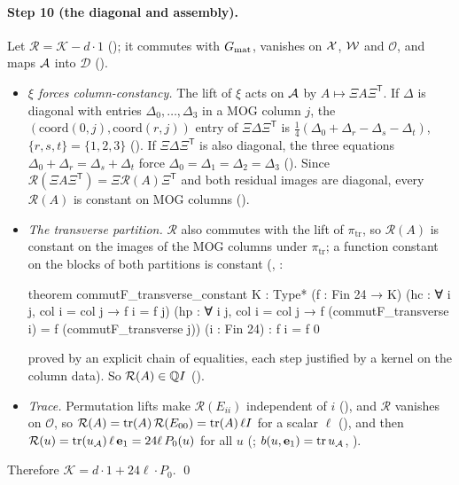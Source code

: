 \paragraph{Step 10 (the diagonal and assembly).}  Let $\mathcal R=\mathcal K-d\cdot1$ (); it commutes with
$G_{\mathrm{mat}}$, vanishes on $\mathcal{X}$, $\mathcal{W}$ and $\mathcal O$, and maps $\mathcal{A}$ into $\mathcal D$
().
\begin{itemize}
\item \emph{$\xi$ forces column-constancy.}  The lift of $\xi$ acts on $\mathcal{A}$ by $A\mapsto\Xi A\Xi^{\mathsf T}$.  If
  $\Delta$ is diagonal with entries $\Delta_0,\dots,\Delta_3$ in a MOG column $j$, the $(\mathrm{coord}(0,j),\mathrm{coord}(r,j))$
  entry of $\Xi\Delta\Xi^{\mathsf T}$ is $\tfrac14(\Delta_0+\Delta_r-\Delta_s-\Delta_t)$, $\{r,s,t\}=\{1,2,3\}$
  ().  If $\Xi\Delta\Xi^{\mathsf T}$ is also diagonal, the three equations
  $\Delta_0+\Delta_r=\Delta_s+\Delta_t$ force $\Delta_0=\Delta_1=\Delta_2=\Delta_3$ ().  Since
  $\mathcal R(\Xi A\Xi^{\mathsf T})=\Xi\mathcal R(A)\Xi^{\mathsf T}$ and both residual images are diagonal, every $\mathcal R(A)$ is
  constant on MOG columns ().
\item \emph{The transverse partition.}  $\mathcal R$ also commutes with the lift of $\pi_{\mathrm{tr}}$, so $\mathcal R(A)$ is
  constant on the images of the MOG columns under $\pi_{\mathrm{tr}}$; a function constant on the blocks of both partitions is
  constant (, :
\begin{leancode}
theorem commutF_transverse_constant {K : Type*} (f : Fin 24 → K)
    (hc : ∀ i j, col i = col j → f i = f j)
    (hp : ∀ i j, col i = col j → f (commutF_transverse i) =
      f (commutF_transverse j)) (i : Fin 24) : f i = f 0
\end{leancode}
  proved by an explicit chain of equalities, each step justified by a kernel  on the column data).  So
  $\mathcal R(A)\in{\mathbb{Q}} I$ ().
\item \emph{Trace.}  Permutation lifts make $\mathcal R(E_{ii})$ independent of $i$ (), and
  $\mathcal R$ vanishes on $\mathcal O$, so $\mathcal R(A)=\operatorname{tr}(A)\,\mathcal R(E_{00})=\operatorname{tr}(A)\,\ell I$ for a scalar $\ell$
  (), and then $\mathcal R(u)=\operatorname{tr}(u_{\mathcal{A}})\,\ell\,\mathbf{e}_1=24\ell\,P_0(u)$ for all $u$
  (; $b(u,\mathbf{e}_1)=\operatorname{tr} u_{\mathcal{A}}$, ).
\end{itemize}
Therefore $\mathcal K=d\cdot1+24\ell\cdot P_0$. \qed

